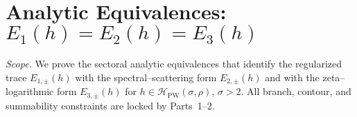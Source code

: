
\section{Analytic Equivalences: $E_1(h)=E_2(h)=E_3(h)$}
\label{sec:ch6-part3-analytic-equivalences} \relax \hspace{0pt}
\FlowBreaker
\noindent\emph{Scope.} We prove the sectoral analytic equivalences that identify the regularized trace $E_{1,\pm}(h)$ with the spectral–scattering form $E_{2,\pm}(h)$ and with the zeta–logarithmic form $E_{3,\pm}(h)$ for $h\in\mathcal H_{\mathrm{PW}}(\sigma,\rho)$, $\sigma>2$. All branch, contour, and summability constraints are locked by Parts~1–2. %


